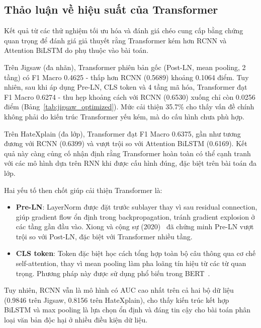 \documentclass[../BTL.tex]{subfiles}
\begin{document}
\subsection{Thảo luận về hiệu suất của Transformer}
Kết quả từ các thử nghiệm tối ưu hóa và đánh giá chéo cung cấp bằng chứng quan trọng để đánh giá giả thuyết rằng Transformer kém hơn RCNN và Attention BiLSTM do phụ thuộc vào bài toán.

Trên Jigsaw (đa nhãn), Transformer phiên bản gốc (Post-LN, mean pooling, 2 tầng) có F1 Macro 0.4625 - thấp hơn RCNN (0.5689) khoảng 0.1064 điểm. Tuy nhiên, sau khi áp dụng Pre-LN, CLS token và 4 tầng mã hóa, Transformer đạt F1 Macro 0.6274 - thu hẹp khoảng cách với RCNN (0.6530) xuống chỉ còn 0.0256 điểm (Bảng~\ref{tab:jigsaw_optimized}). Mức cải thiện 35.7\% cho thấy vấn đề chính không phải do kiến trúc Transformer yếu kém, mà do cấu hình chưa phù hợp.

Trên HateXplain (đa lớp), Transformer đạt F1 Macro 0.6375, gần như tương đương với RCNN (0.6399) và vượt trội so với Attention BiLSTM (0.6169). Kết quả này càng củng cố nhận định rằng Transformer hoàn toàn có thể cạnh tranh với các mô hình dựa trên RNN khi được cấu hình đúng, đặc biệt trên bài toán đa lớp.

Hai yếu tố then chốt giúp cải thiện Transformer là:
\begin{itemize}
    \item \textbf{Pre-LN}: LayerNorm được đặt trước sublayer thay vì sau residual connection, giúp gradient flow ổn định trong backpropagation, tránh gradient explosion ở các tầng gần đầu vào. Xiong và cộng sự (2020)~\cite{xiong2020layer} đã chứng minh Pre-LN vượt trội so với Post-LN, đặc biệt với Transformer nhiều tầng.
    \item \textbf{CLS token}: Token đặc biệt học cách tổng hợp toàn bộ câu thông qua cơ chế self-attention, thay vì mean pooling làm pha loãng tín hiệu từ các từ quan trọng. Phương pháp này được sử dụng phổ biến trong BERT~\cite{devlin2019bert}.
\end{itemize}

Tuy nhiên, RCNN vẫn là mô hình có AUC cao nhất trên cả hai bộ dữ liệu (0.9846 trên Jigsaw, 0.8156 trên HateXplain), cho thấy kiến trúc kết hợp BiLSTM và max pooling là lựa chọn ổn định và đáng tin cậy cho bài toán phân loại văn bản độc hại ở nhiều điều kiện dữ liệu.
\end{document}
